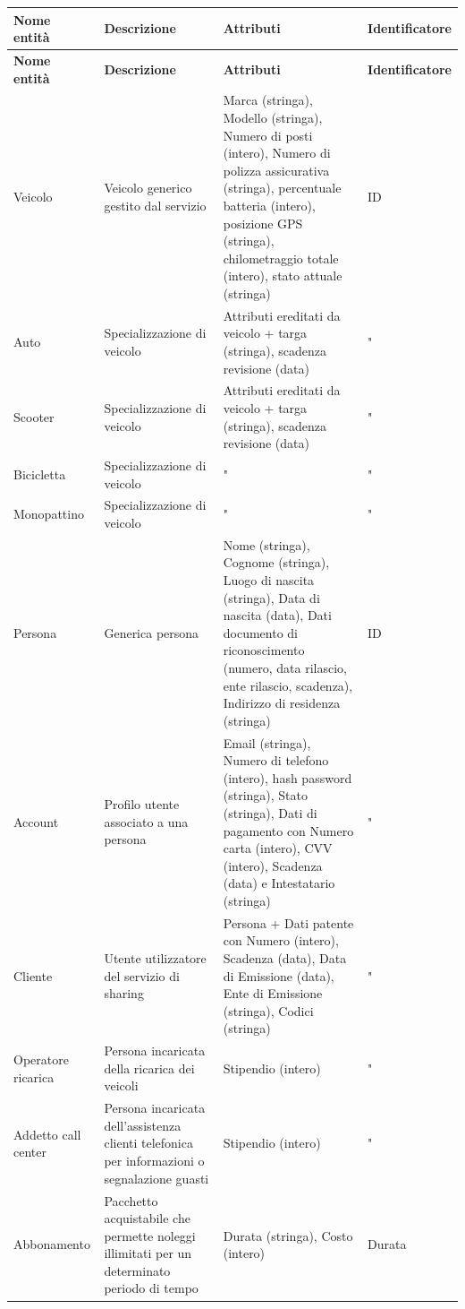 \documentclass{article}
\begin{document}
\begin{longtable}[H]{|p{2.5cm}|p{4.8cm}|p{4.8cm}|p{2.3cm}|}
\hline
\textbf{Nome entità} & \textbf{Descrizione} & \textbf{Attributi} & \textbf{Identificatore} \\
\hline
\endfirsthead
\hline
\textbf{Nome entità} & \textbf{Descrizione} & \textbf{Attributi} & \textbf{Identificatore} \\
\hline
\endhead
Veicolo & Veicolo generico gestito dal servizio & Marca (stringa), Modello (stringa), Numero di posti (intero), Numero di polizza assicurativa (stringa), percentuale batteria (intero), posizione GPS (stringa), chilometraggio totale (intero), stato attuale (stringa) & ID \\ \hline
Auto & Specializzazione di veicolo & Attributi ereditati da veicolo + targa (stringa), scadenza revisione (data) & "\\ \hline
Scooter & Specializzazione di veicolo & Attributi ereditati da veicolo + targa (stringa), scadenza revisione (data) & " \\ \hline
Bicicletta & Specializzazione di veicolo & " & " \\ \hline
Monopattino & Specializzazione di veicolo & " & " \\ \hline
Persona & Generica persona & Nome (stringa), Cognome (stringa), Luogo di nascita (stringa), Data di nascita (data), Dati documento di riconoscimento (numero, data rilascio, ente rilascio, scadenza), Indirizzo di residenza (stringa) & ID \\ \hline
Account & Profilo utente associato a una persona & Email (stringa), Numero di telefono (intero), hash password (stringa), Stato (stringa), Dati di pagamento con Numero carta (intero), CVV (intero), Scadenza (data) e Intestatario (stringa) & " \\ \hline
Cliente & Utente utilizzatore del servizio di sharing & Persona + Dati patente con Numero (intero), Scadenza (data), Data di Emissione (data), Ente di Emissione (stringa), Codici (stringa) & " \\ \hline
Operatore ricarica & Persona incaricata della ricarica dei veicoli & Stipendio (intero) & " \\ \hline
Addetto call center & Persona incaricata dell'assistenza clienti telefonica per informazioni o segnalazione guasti & Stipendio (intero) & " \\ \hline
Abbonamento & Pacchetto acquistabile che permette noleggi illimitati per un determinato periodo di tempo & Durata (stringa), Costo (intero) & Durata \\ \hline

\end{longtable}
\end{document}

